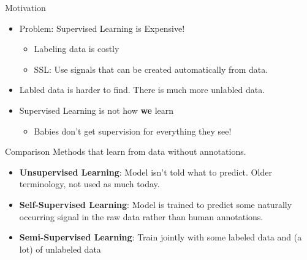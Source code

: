 \documentclass[serif, aspectratio=169]{beamer}
\begin{document}
\begin{frame}[t]{Motivation}
  
    \begin{itemize}
        \item Problem: Supervised Learning is Expensive!
            \begin{itemize}
        \item Labeling data is costly
\item SSL: Use signals that can be created automatically from data.
    \end{itemize}
\item Labled data is harder to find. There is much more unlabled data.
\item Supervised Learning is not how \textbf{we} learn
  \begin{itemize}
 \item Babies don’t get supervision for everything they see!

     \end{itemize}

    \end{itemize}

\end{frame}



\begin{frame}[t]{Comparison}
Methods that learn from data without annotations.
    \begin{itemize}
        
\item \textbf{ Unsupervised Learning}: Model isn’t told what to predict. Older 
terminology, not used as much today.
 \item \textbf{ Self-Supervised Learning}: Model is trained to predict some naturally
occurring signal in the raw data rather than human annotations.
 \item \textbf{  Semi-Supervised Learning}: Train jointly with some labeled data and (a lot)
 of unlabeled data
    \end{itemize}
\end{frame}
\end{document}
